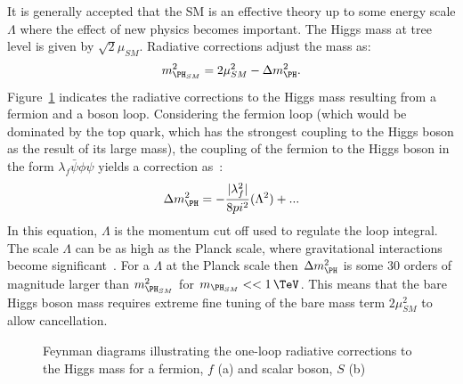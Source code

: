 It is generally accepted that the \ac{SM} is an effective theory up to some
energy scale $\Lambda$ where the effect of new physics becomes important. 
The Higgs mass at tree level is given by $\sqrt{2}\mu_{SM}$. Radiative
corrections adjust the mass as:
\begin{equation}
m_{\PH_{SM}}^{2} = 2\mu_{SM}^{2} - \Delta m_{\PH}^{2}. 
\end{equation}
Figure~\ref{fig:HiggsMassLoops} indicates the radiative
corrections to the Higgs mass resulting from a fermion and a boson loop.
Considering the fermion loop (which would be dominated by the top quark, which
has the strongest coupling to the Higgs boson as the result of its large mass), 
the coupling of the fermion to the Higgs boson in
the form $\lambda_{f}\bar{\psi}\phi\psi$ yields a correction as~\cite{Carena:2002es}:
\begin{equation}
\Delta m_{\PH}^{2} = - \frac{|\lambda_{f}^{2}|}{8\pi^{2}}(\Lambda^{2}) + ...
\end{equation}
In this equation, $\Lambda$ is the momentum cut off used to regulate the loop
integral. The scale $\Lambda$ can be as high as the Planck scale, where gravitational
interactions become significant~\cite{Griffiths:2008nx}. For a $\Lambda$ at the Planck scale then
$\Delta m_{\PH}^{2}$ is some 30 orders of magnitude larger than 
$m_{\PH_{SM}}^{2}$ for $m_{\PH_{SM}}<<1\,\TeV$. This means that the bare Higgs
boson mass requires extreme fine tuning of the bare mass term $2\mu_{SM}^{2}$ to
allow cancellation.

\begin{figure}[htbp]
\caption{Feynman diagrams illustrating the one-loop radiative corrections to the Higgs
mass for a fermion, $f$ (a) and scalar boson, $S$ (b)}
\label{fig:HiggsMassLoops}
\end{figure}

